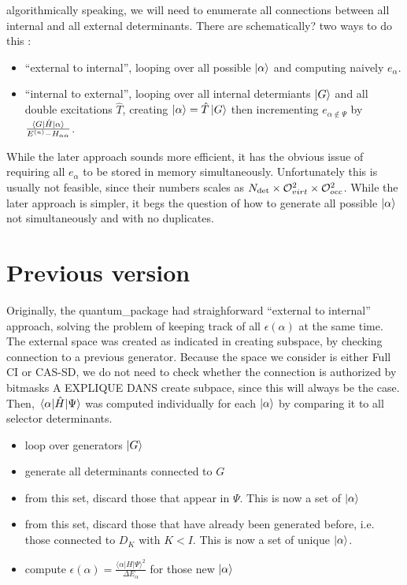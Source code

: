 \documentclass[./thesis.tex]{subfiles}
\begin{document}
algorithmically speaking, we will need to enumerate all connections between all internal and all external determinants. There are \alert{schematically?} two ways to do this :

\begin{itemize}
\item
``external to internal'', looping over all possible ${\ket{\alpha}}$ and computing naively $e_\alpha$.
\item
``internal to external'', looping over all internal determiants $\ket G$ and all double excitations $\hat T$, creating ${\ket{\alpha}} = \hat T \ket G$ then incrementing $e_{\alpha \notin \Psi}$ by $\frac{\mel{G}{\hat{H}}{\alpha}}{E^{(n)} - H_{\alpha \alpha}}$. 
\end{itemize}

While the later approach sounds more efficient, it has the obvious issue of requiring all $e_\alpha$ to be stored in memory simultaneously. Unfortunately this is usually not feasible, since their numbers scales as ${N_\text{det}} \times \mathcal{O}_{virt}^2 \times \mathcal{O}_{occ}^2$.
While the later approach is simpler, it begs the question of how to generate all possible ${\ket{\alpha}}$ not simultaneously and with no duplicates.


\section{Previous version}

Originally, the quantum\_package had straighforward ``external to internal'' approach, solving the problem of keeping track of all $\epsilon(\alpha)$ at the same time. The external space was created as indicated in \alert{creating subspace}, by checking connection to a previous generator. Because the space we consider is either Full CI or CAS-SD, we do not need to check whether the connection is authorized by bitmasks  \alert{A EXPLIQUE DANS create subpace}, since this will always be the case. Then, $\mel{\alpha}{\hat{H}}{\Psi}$ was computed individually for each ${\ket{\alpha}}$ by comparing it to all selector determinants.

\begin{itemize}
\item
loop over generators $\ket G$
\item
generate all determinants connected to $G$
\item
from this set, discard those that appear in $\Psi$. This is now a set of $\ket \alpha$
\item
from this set, discard those that have already been generated before, i.e. those connected to $D_K$ with $K<I$. This is now a set of unique $\ket \alpha$.
\item
compute $\epsilon(\alpha) = \frac{\langle \alpha|H|\Psi\rangle^2}{\Delta E_\alpha}$ for those new $\ket \alpha$
\end{itemize}
\end{document}
